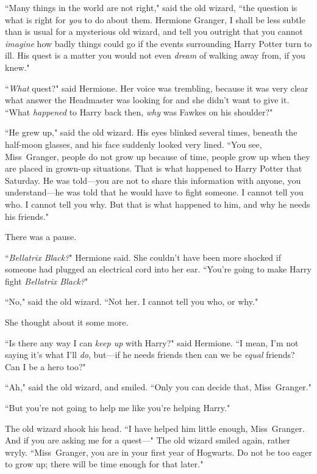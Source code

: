 ``Many things in the world are not right," said the old wizard, ``the question is what is right for \emph{you} to do about them. Hermione Granger, I shall be less subtle than is usual for a mysterious old wizard, and tell you outright that you cannot \emph{imagine} how badly things could go if the events surrounding Harry Potter turn to ill. His quest is a matter you would not even \emph{dream} of walking away from, if you knew."

``\emph{What} quest?" said Hermione. Her voice was trembling, because it was very clear what answer the Headmaster was looking for and she didn't want to give it. ``What \emph{happened} to Harry back then, \emph{why} was Fawkes on his shoulder?"

``He grew up," said the old wizard. His eyes blinked several times, beneath the half-moon glasses, and his face suddenly looked very lined. ``You see, Miss~Granger, people do not grow up because of time, people grow up when they are placed in grown-up situations. That is what happened to Harry Potter that Saturday. He was told—you are not to share this information with anyone, you understand—he was told that he would have to fight someone. I cannot tell you who. I cannot tell you why. But that is what happened to him, and why he needs his friends."

There was a pause.

``\emph{Bellatrix Black?}" Hermione said. She couldn't have been more shocked if someone had plugged an electrical cord into her ear. ``You're going to make Harry fight \emph{Bellatrix Black?}"

``No," said the old wizard. ``Not her. I cannot tell you who, or why."

She thought about it some more.

``Is there any way I can \emph{keep up} with Harry?" said Hermione. ``I mean, I'm not saying it's what I'll \emph{do}, but—if he needs friends then can we be \emph{equal} friends? Can I be a hero too?"

``Ah," said the old wizard, and smiled. ``Only you can decide that, Miss~Granger."

``But you're not going to help me like you're helping Harry."

The old wizard shook his head. ``I have helped him little enough, Miss~Granger. And if you are asking me for a quest—" The old wizard smiled again, rather wryly. ``Miss~Granger, you are in your first year of Hogwarts. Do not be too eager to grow up; there will be time enough for that later."


